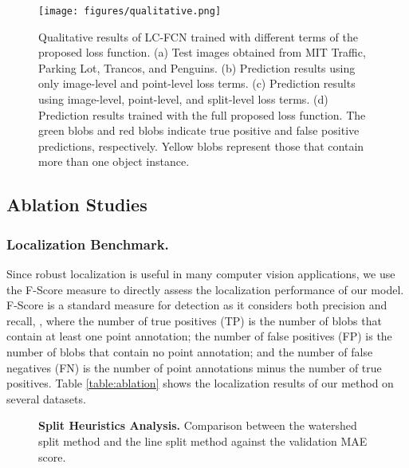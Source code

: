 \documentclass[runningheads]{llncs}
\begin{document}
\begin{figure}[ht]
\centering
\texttt{[image: figures/qualitative.png]}
\caption{Qualitative results of LC-FCN trained with different terms of the proposed loss function. (a) Test images obtained from MIT Traffic,  Parking Lot, Trancos, and Penguins. (b) Prediction results using only image-level and point-level loss terms. (c) Prediction results using image-level, point-level, and split-level loss terms. (d) Prediction results trained with the full proposed loss function. The green blobs and red blobs indicate true positive and false positive predictions, respectively. Yellow blobs represent those that contain more than one object instance.}
\label{fig:ablation}
\end{figure}

\subsection{Ablation Studies}\label{sec:ablation}


\subsubsection{Localization Benchmark.} Since robust localization is useful in many computer vision applications, we use the F-Score measure to directly assess the localization performance of our model. F-Score is a standard measure for detection as it considers both precision and recall, , where the number of true positives (TP) is the number of blobs that contain at least one point annotation; the number of false positives (FP) is the number of blobs that contain no point annotation; and the number of false negatives (FN) is the number of point annotations minus the number of true positives. Table \ref{table:ablation} shows the localization results of our method on several datasets.






\begin{figure}
\caption{{\bf Split Heuristics Analysis.} Comparison between the watershed split method and the line split method against the validation MAE score.}
\label{fig:crowd2}
\hspace{-0.35in}
\begin{floatrow}
{\label{tab:res-pascal}}
\hspace{-2.8in}
\end{floatrow}
\end{figure}
\end{document}
